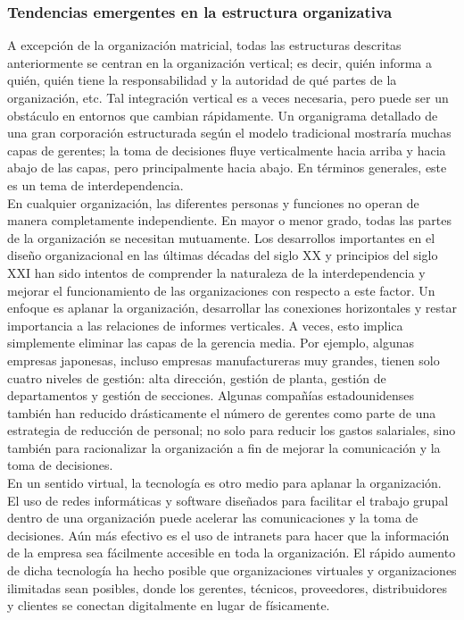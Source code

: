 \documentclass[10pt]{book}
\begin{document}
\subsubsection{Tendencias emergentes en la estructura organizativa}
A excepción de la organización matricial, todas las estructuras descritas anteriormente se centran en la organización vertical; es decir, quién informa a quién, quién tiene la responsabilidad y la autoridad de qué partes de la organización, etc. Tal integración vertical es a veces necesaria, pero puede ser un obstáculo en entornos que cambian rápidamente. Un organigrama detallado de una gran corporación estructurada según el modelo tradicional mostraría muchas capas de gerentes; la toma de decisiones fluye verticalmente hacia arriba y hacia abajo de las capas, pero principalmente hacia abajo. En términos generales, este es un tema de interdependencia.\\
En cualquier organización, las diferentes personas y funciones no operan de manera completamente independiente. En mayor o menor grado, todas las partes de la organización se necesitan mutuamente. Los desarrollos importantes en el diseño organizacional en las últimas décadas del siglo XX y principios del siglo XXI han sido intentos de comprender la naturaleza de la interdependencia y mejorar el funcionamiento de las organizaciones con respecto a este factor. Un enfoque es aplanar la organización, desarrollar las conexiones horizontales y restar importancia a las relaciones de informes verticales. A veces, esto implica simplemente eliminar las capas de la gerencia media. Por ejemplo, algunas empresas japonesas, incluso empresas manufactureras muy grandes, tienen solo cuatro niveles de gestión: alta dirección, gestión de planta, gestión de departamentos y gestión de secciones. Algunas compañías estadounidenses también han reducido drásticamente el número de gerentes como parte de una estrategia de reducción de personal; no solo para reducir los gastos salariales, sino también para racionalizar la organización a fin de mejorar la comunicación y la toma de decisiones.\\
En un sentido virtual, la tecnología es otro medio para aplanar la organización. El uso de redes informáticas y software diseñados para facilitar el trabajo grupal dentro de una organización puede acelerar las comunicaciones y la toma de decisiones. Aún más efectivo es el uso de intranets para hacer que la información de la empresa sea fácilmente accesible en toda la organización. El rápido aumento de dicha tecnología ha hecho posible que organizaciones virtuales y organizaciones ilimitadas sean posibles, donde los gerentes, técnicos, proveedores, distribuidores y clientes se conectan digitalmente en lugar de físicamente.\\
\end{document}
